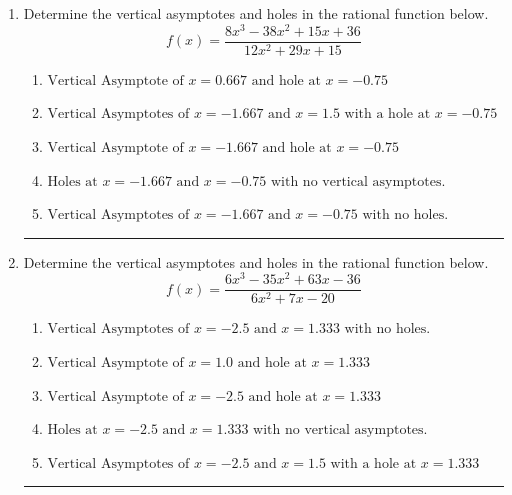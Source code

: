 \documentclass[14pt]{extbook}
\newcommand{\litem}[1]{\item#1\hspace*{-1cm}\rule{\textwidth}{0.4pt}}
\begin{document}
\begin{enumerate}
\litem{
Determine the vertical asymptotes and holes in the rational function below.\[ f(x) = \frac{8x^{3} -38 x^{2} +15 x + 36}{12x^{2} +29 x + 15} \]\begin{enumerate}[label=\Alph*.]
\item \( \text{Vertical Asymptote of } x = 0.667 \text{ and hole at } x = -0.75 \)
\item \( \text{Vertical Asymptotes of } x = -1.667 \text{ and } x = 1.5 \text{ with a hole at } x = -0.75 \)
\item \( \text{Vertical Asymptote of } x = -1.667 \text{ and hole at } x = -0.75 \)
\item \( \text{Holes at } x = -1.667 \text{ and } x = -0.75 \text{ with no vertical asymptotes.} \)
\item \( \text{Vertical Asymptotes of } x = -1.667 \text{ and } x = -0.75 \text{ with no holes.} \)

\end{enumerate} }
\litem{
Determine the vertical asymptotes and holes in the rational function below.\[ f(x) = \frac{6x^{3} -35 x^{2} +63 x -36}{6x^{2} +7 x -20} \]\begin{enumerate}[label=\Alph*.]
\item \( \text{Vertical Asymptotes of } x = -2.5 \text{ and } x = 1.333 \text{ with no holes.} \)
\item \( \text{Vertical Asymptote of } x = 1.0 \text{ and hole at } x = 1.333 \)
\item \( \text{Vertical Asymptote of } x = -2.5 \text{ and hole at } x = 1.333 \)
\item \( \text{Holes at } x = -2.5 \text{ and } x = 1.333 \text{ with no vertical asymptotes.} \)
\item \( \text{Vertical Asymptotes of } x = -2.5 \text{ and } x = 1.5 \text{ with a hole at } x = 1.333 \)


\end{enumerate}}
\end{enumerate}
\end{document}
